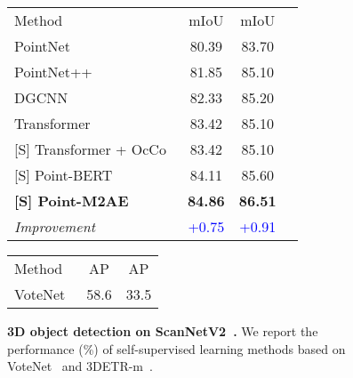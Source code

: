 \documentclass{article}
\makeatletter
\newcommand\tabcaption{\def\@captype{table}\caption}
\makeatother
\begin{document}
\begin{figure*}[t!]
\vspace{0.2cm}
\begin{minipage}[h!]{0.53\linewidth}
\vspace{0.3cm}
\centering
\small
\label{seg}
\tabcaption{\textbf{Part segmentation on ShapeNetPart~\cite{shapenetpart}}. `mIoU' (\%) and `mIoU' (\%) denote the mean IoU across all part categories and all instances in the dataset, respectively.}
\vspace{0.2cm}
\begin{adjustbox}{width=0.95\linewidth}
	\begin{tabular}{lccc}
	\toprule
Method &mIoU &mIoU\\
		\cmidrule(lr){1-1} \cmidrule(lr){2-2} \cmidrule(lr){3-3}  
	    PointNet~\cite{qi2017pointnet}  &80.39 &83.70 \\
	    PointNet++~\cite{qi2017pointnet++} &81.85 &85.10 \\
	    DGCNN~\cite{dgcnn} &82.33 &85.20 \\
	    \cmidrule(lr){1-3}
Transformer~\cite{pointbert} &83.42 &85.10 \\
	    {[S]} Transformer + OcCo~\cite{pointbert} &83.42 &85.10 \\
	    {[S]} Point-BERT~\cite{pointbert} &84.11 &85.60 \\
\rowcolor{gray!8} \textbf{[S] Point-M2AE} &\textbf{84.86} &\textbf{86.51}\vspace{0.1cm}\\
	    \textit{Improvement} &\textcolor{blue}{+0.75} &\textcolor{blue}{+0.91} \\
	  \bottomrule
	\end{tabular}
\end{adjustbox}
\end{minipage}\quad
\begin{minipage}[h!]{0.43\linewidth}
\centering
\small
\vspace{0.3cm}
\label{detect}
\tabcaption{\textbf{3D object detection on ScanNetV2~\cite{ScanNetV2}.} We report the performance (\%) of self-supervised learning methods based on VoteNet~\cite{votenet} and 3DETR-m~\cite{3detr}.}
\vspace{0.2cm}
\begin{adjustbox}{width=0.95\linewidth}
		\begin{tabular}{lcc}
	\toprule
Method &AP &AP\\
		\cmidrule(lr){1-1} \cmidrule(lr){2-2}\cmidrule(lr){3-3}
		VoteNet~\cite{votenet} &58.6 &33.5 \\

\end{tabular}
\end{adjustbox}
\end{minipage}
\end{figure*}
\end{document}

